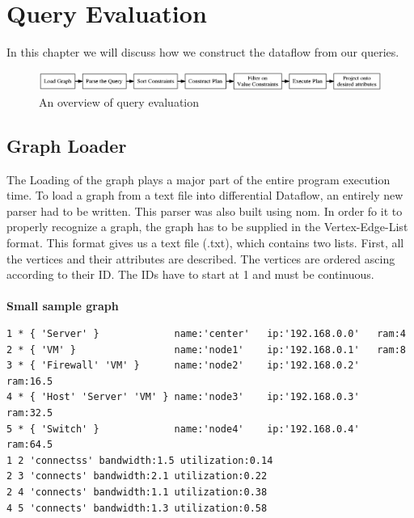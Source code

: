 \documentclass[11pt,singlecolumn]{scrartcl}
\begin{document}

\section{Query Evaluation}
In this chapter we will discuss how we construct the dataflow from our queries.
\begin{figure}[H]
\includegraphics[width=1\textwidth]{pgr}
\caption{An overview of query evaluation}
\end{figure}
\subsection{Graph Loader}
The Loading of the graph plays a major part of the entire program execution time. To load a graph from a text file into differential Dataflow, an entirely new parser had to be written. This parser was also built using nom. In order fo it to properly recognize a graph, the graph has to be supplied in the Vertex-Edge-List format\cite{EdgeList}. This format gives us a text file (.txt), which contains two lists. First, all the vertices and their attributes are described. The vertices are ordered ascing according to their ID. The IDs have to start at 1 and must be continuous.\\\\
\textbf{Small sample graph}
\begin{lstlisting}
1 * { 'Server' }             name:'center'   ip:'192.168.0.0'   ram:4
2 * { 'VM' }                 name:'node1'    ip:'192.168.0.1'   ram:8
3 * { 'Firewall' 'VM' }      name:'node2'    ip:'192.168.0.2'   ram:16.5
4 * { 'Host' 'Server' 'VM' } name:'node3'    ip:'192.168.0.3'   ram:32.5
5 * { 'Switch' }             name:'node4'    ip:'192.168.0.4'   ram:64.5
1 2 'connectss' bandwidth:1.5 utilization:0.14
2 3 'connects' bandwidth:2.1 utilization:0.22
2 4 'connects' bandwidth:1.1 utilization:0.38
4 5 'connects' bandwidth:1.3 utilization:0.58
\end{lstlisting}
\end{document}
